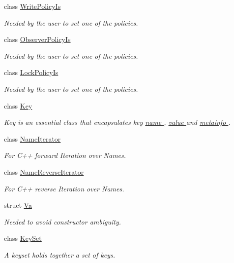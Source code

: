 \begin{DoxyCompactItemize}
class \hyperlink{classkdb_1_1WritePolicyIs}{Write\-Policy\-Is}
\begin{DoxyCompactList}\small\item\em Needed by the user to set one of the policies. \end{DoxyCompactList}\item 
class \hyperlink{classkdb_1_1ObserverPolicyIs}{Observer\-Policy\-Is}
\begin{DoxyCompactList}\small\item\em Needed by the user to set one of the policies. \end{DoxyCompactList}\item 
class \hyperlink{classkdb_1_1LockPolicyIs}{Lock\-Policy\-Is}
\begin{DoxyCompactList}\small\item\em Needed by the user to set one of the policies. \end{DoxyCompactList}\item 
class \hyperlink{classkdb_1_1Key}{Key}
\begin{DoxyCompactList}\small\item\em Key is an essential class that encapsulates key \hyperlink{group__keyname}{name }, \hyperlink{group__keyvalue}{value } and \hyperlink{group__keymeta}{metainfo }.  \end{DoxyCompactList}\item 
class \hyperlink{classkdb_1_1NameIterator}{Name\-Iterator}
\begin{DoxyCompactList}\small\item\em For C++ forward Iteration over Names. \end{DoxyCompactList}\item 
class \hyperlink{classkdb_1_1NameReverseIterator}{Name\-Reverse\-Iterator}
\begin{DoxyCompactList}\small\item\em For C++ reverse Iteration over Names. \end{DoxyCompactList}\item 
struct \hyperlink{structkdb_1_1Va}{Va}
\begin{DoxyCompactList}\small\item\em Needed to avoid constructor ambiguity. \end{DoxyCompactList}\item 
class \hyperlink{classkdb_1_1KeySet}{Key\-Set}
\begin{DoxyCompactList}\small\item\em A keyset holds together a set of keys. \end{DoxyCompactList}\item 

\end{DoxyCompactItemize}
